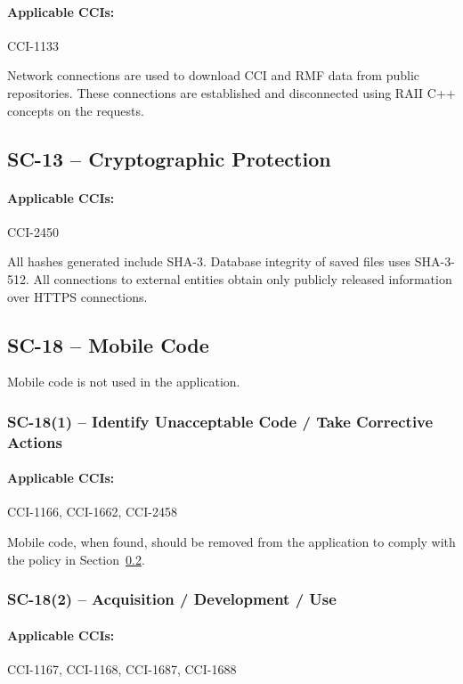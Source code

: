 \documentclass[letterpaper, 10pt, twoside]{article}
\begin{document}
\paragraph{Applicable CCIs:} CCI-1133

Network connections are used to download CCI and RMF data from public repositories. These connections are established and disconnected using RAII C++ concepts on the requests.

\subsection{SC-13 -- Cryptographic Protection}

\paragraph{Applicable CCIs:} CCI-2450

All hashes generated include SHA-3. Database integrity of saved files uses SHA-3-512. All connections to external entities obtain only publicly released information over HTTPS connections.

\subsection{SC-18 -- Mobile Code}
\label{sec:sc-18}

Mobile code is not used in the application.

\subsubsection{SC-18(1) -- Identify Unacceptable Code / Take Corrective Actions}

\paragraph{Applicable CCIs:} CCI-1166, CCI-1662, CCI-2458

Mobile code, when found, should be removed from the application to comply with the policy in Section~\ref{sec:sc-18}.

\subsubsection{SC-18(2) -- Acquisition / Development / Use}

\paragraph{Applicable CCIs:} CCI-1167, CCI-1168, CCI-1687, CCI-1688
\end{document}
